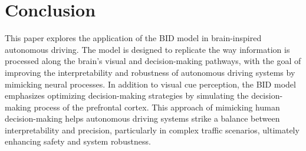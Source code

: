 \section{Conclusion}
\label{sec:conclusion}
\hspace{1pc}This paper explores the application of the BID model in brain-inspired autonomous driving. 
The model is designed to replicate the way information is processed along the brain's visual and decision-making pathways, with the goal of improving the interpretability and robustness of autonomous driving systems by mimicking neural processes. 
In addition to visual cue perception, the BID model emphasizes optimizing decision-making strategies by simulating the decision-making process of the prefrontal cortex. 
This approach of mimicking human decision-making helps autonomous driving systems strike a balance between interpretability and precision, particularly in complex traffic scenarios, ultimately enhancing safety and system robustness.
